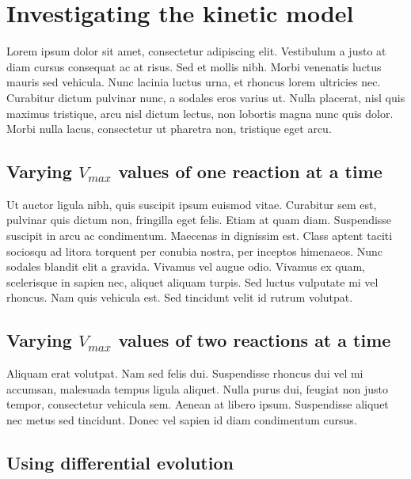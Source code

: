 \documentclass[parskip=full]{scrreprt}
\begin{document}
\chapter{Investigating the kinetic model}
\label{ch:kinetic}

Lorem ipsum dolor sit amet, consectetur adipiscing elit. Vestibulum a justo at diam cursus consequat ac at risus. Sed et mollis nibh. Morbi venenatis luctus mauris sed vehicula. Nunc lacinia luctus urna, et rhoncus lorem ultricies nec. Curabitur dictum pulvinar nunc, a sodales eros varius ut. Nulla placerat, nisl quis maximus tristique, arcu nisl dictum lectus, non lobortis magna nunc quis dolor. Morbi nulla lacus, consectetur ut pharetra non, tristique eget arcu.

\section{Varying $V_{max}$ values of one reaction at a time}
\label{sec:onereac}

Ut auctor ligula nibh, quis suscipit ipsum euismod vitae. Curabitur sem est, pulvinar quis dictum non, fringilla eget felis. Etiam at quam diam. Suspendisse suscipit in arcu ac condimentum. Maecenas in dignissim est. Class aptent taciti sociosqu ad litora torquent per conubia nostra, per inceptos himenaeos. Nunc sodales blandit elit a gravida. Vivamus vel augue odio. Vivamus ex quam, scelerisque in sapien nec, aliquet aliquam turpis. Sed luctus vulputate mi vel rhoncus. Nam quis vehicula est. Sed tincidunt velit id rutrum volutpat.

\section{Varying $V_{max}$ values of two reactions at a time}
\label{sec:couples}

Aliquam erat volutpat. Nam sed felis dui. Suspendisse rhoncus dui vel mi accumsan, malesuada tempus ligula aliquet. Nulla purus dui, feugiat non justo tempor, consectetur vehicula sem. Aenean at libero ipsum. Suspendisse aliquet nec metus sed tincidunt. Donec vel sapien id diam condimentum cursus.

\section{Using differential evolution}
\label{sec:de}
\end{document}
